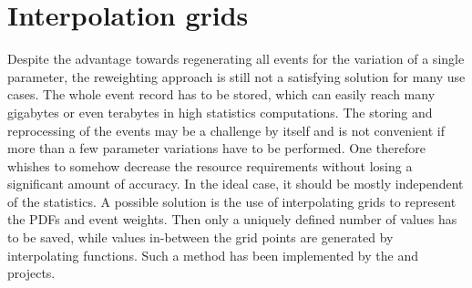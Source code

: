 \section{Interpolation grids}
Despite the advantage towards regenerating all events for the variation of a single parameter, the reweighting approach is still not a satisfying solution for many use cases.
The whole event record has to be stored, which can easily reach many gigabytes or even terabytes in high statistics computations.
The storing and reprocessing of the events may be a challenge by itself and is not convenient if more than a few parameter variations have to be performed.
One therefore whishes to somehow decrease the resource requirements without losing a significant amount of accuracy.
In the ideal case, it should be mostly independent of the statistics.
A possible solution is the use of interpolating grids to represent the PDFs and event weights.
Then only a uniquely defined number of values has to be saved, while values in-between the grid points are generated by interpolating functions.
Such a method has been implemented by the \appl{} \cite{applgrid2010} and \fnlo{} \cite{fastnlo2006,fastnlo2011} projects.

